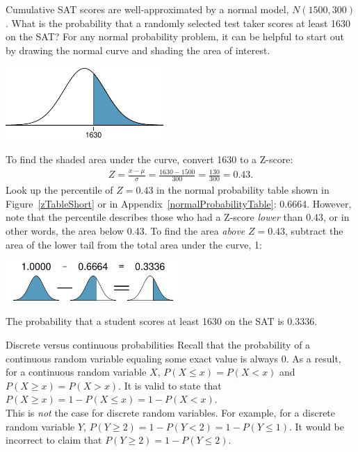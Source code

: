 \begin{examplewrap}
\begin{nexample}{Cumulative SAT scores are well-approximated by a normal model, $N(1500, 300)$. What is the probability that a randomly selected test taker scores at least 1630 on the SAT?}\label{satAbove1630Exam}%
For any normal probability problem, it can be helpful to start out by drawing the normal curve and shading the area of interest.

\begin{center}
\includegraphics[width=0.45\textwidth]{ch_distributions_oi_biostat/figures/satAbove1630/satAbove1630}
\end{center}
To find the shaded area under the curve, convert 1630 to a Z-score:
\begin{align*}
Z = \frac{x - \mu}{\sigma} = \frac{1630 - 1500}{300} = \frac{130}{300} = 0.43.
\end{align*}
Look up the percentile of $Z=0.43$ in the normal probability table shown in Figure~\ref{zTableShort} or in Appendix~\vref{normalProbabilityTable}: 0.6664. However, note that the percentile describes those who had a Z-score \emph{lower} than 0.43, or in other words, the area below 0.43. To find the area \emph{above} $Z=0.43$, subtract the area of the lower tail from the total area under the curve, 1:
\begin{center}
\includegraphics[width=0.5\textwidth]{ch_distributions_oi_biostat/figures/subtractingArea/subtractingArea}
\end{center}
The probability that a student scores at least 1630 on the SAT is 0.3336.
\end{nexample}
\end{examplewrap}

\begin{onebox}{Discrete versus continuous probabilities}
\label{discreteVsContDistr}%
Recall that the probability of a continuous random variable equaling some exact value is always 0. As a result, for a continuous random variable $X$, $P(X \leq x) = P(X < x)$ and $P(X \geq x) = P(X > x)$. It is valid to state that $P(X \geq x) = 1 - P(X \leq x) = 1 - P(X < x)$.\\
		
This is \textit{not} the case for discrete random variables. For example, for a discrete random variable $Y$, $P(Y \geq 2) = 1 - P(Y < 2) = 1 - P(Y \leq 1)$. It would be incorrect to claim that $P(Y \geq 2) = 1 - P(Y \leq 2)$.
\end{onebox}

